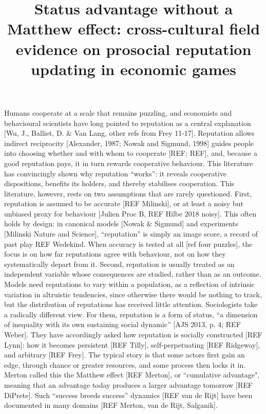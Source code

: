 \documentclass{article}
\begin{document}
\title{Status advantage without a Matthew effect: cross-cultural field evidence on prosocial reputation updating in economic games} 
\date{}

\pagestyle{fancy}

\bigbreak
Humans cooperate at a scale that remains puzzling, and economists and behavioural scientists have long pointed to reputation as a central explanation \citep{wu_reputation_2016, przepiorka_order_2017} [Wu, J., Balliet, D. \& Van Lang, other refs from Frey 11-17]. Reputation allows indirect reciprocity [Alexander, 1987; Nowak and Sigmund, 1998] guides people into choosing whether and with whom to cooperate [REF; REF], and, because a good reputation pays, it in turn rewards cooperative behaviour. This literature has convincingly shown why reputation ``works'': it reveals cooperative dispositions, benefits its holders, and thereby stabilises cooperation.
\bigbreak
This literature, however, rests on two assumptions that are rarely questioned. First, reputation is assumed to be accurate [REF Milinski], or at least a noisy but unbiased proxy for behaviour [Julien Proc B, REF Hilbe 2018 noisy]. This often holds by design: in canonical models [Nowak \& Sigmund] and experiments [Milinski Nature and Science], ``reputation'' is simply an image score, a record of past play REF Wedekind. When accuracy is tested at all [ref four puzzles], the focus is on how far reputations agree with behaviour, not on how they systematically depart from it. Second, reputation is usually treated as an independent variable whose consequences are studied, rather than as an outcome. Models need reputations to vary within a population, as a reflection of intrinsic variation in altruistic tendencies, since otherwise there would be nothing to track, but the distribution of reputations has received little attention.
\bigbreak
Sociologists take a radically different view. For them, reputation is a form of status, ``a dimension of inequality with its own sustaining social dynamic'' [AJS 2013, p. 4; REF Weber]. They have accordingly asked how reputation is socially constructed [REF Lynn]: how it becomes persistent [REF Tilly], self-perpetuating [REF Ridgeway], and arbitrary [REF Frey]. The typical story is that some actors first gain an edge, through chance or greater resources, and some process then locks it in. Merton called this the Matthew effect [REF Merton], or ``cumulative advantage", meaning that an advantage today produces a larger advantage tomorrow [REF DiPrete]. Such ``success breeds success'' dynamics [REF van de Rijt] have been documented in many domains [REF Merton, van de Rijt, Salganik].
\end{document}
